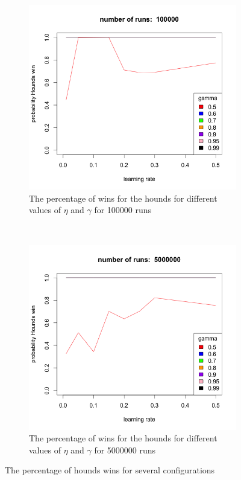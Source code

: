 \begin{figure}[bt]
    \begin{subfigure}{0.49\textwidth}
        \includegraphics[width=\textwidth]{r100000}
        \caption{The percentage of wins for the hounds for different values
            of $\eta$ and $\gamma$ for 100000 runs}
        \label{fig:r100000}
    \end{subfigure}
    ~
    \begin{subfigure}{0.49\textwidth}
        \includegraphics[width=\textwidth]{r5000000}
        \caption{The percentage of wins for the hounds for different values
            of $\eta$ and $\gamma$ for 5000000 runs}
        \label{fig:r5000000}
    \end{subfigure}
    \caption{The percentage of hounds wins for several configurations}
    \label{fig:dat}
\end{figure}

